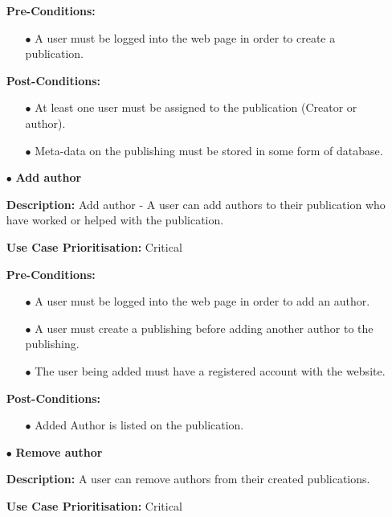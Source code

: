 \documentclass[a4paper,12pt]{article}
\begin{document}
\begin{itemize}
	\textbf{Pre-Conditions:}
	\begin{itemize}
		\item[$\bullet$]A user must be logged into the web page in order to create a publication.
		\\
	\end{itemize}
	\textbf{Post-Conditions: }
	\begin{itemize}
		\item[$\bullet$]At least one user must be assigned to the publication (Creator or author).
		\item[$\bullet$]Meta-data on the publishing must be stored in some form of database.
		\\
	\end{itemize}
	\item[$\bullet$]\textbf{Add author}\newline

	\textbf{Description:} Add author - A user can add authors to their publication who have worked or helped with the publication.\newline
	
	\textbf{Use Case Prioritisation:} Critical\newline

	\textbf{Pre-Conditions:}
	\begin{itemize}
		\item[$\bullet$]A user must be logged into the web page in order to add an author.
		\item[$\bullet$]A user must create a publishing before adding another author to the publishing.
		\item[$\bullet$]The user being added must have a registered account with the website.
		\\
	\end{itemize}
	\textbf{Post-Conditions: }
	\begin{itemize}
		\item[$\bullet$]Added Author is listed on the publication.
		\\
	\end{itemize}
	\newpage
	\item[$\bullet$]\textbf{Remove author}\newline

	\textbf{Description:} A user can remove authors from their created publications.\newline
	
	\textbf{Use Case Prioritisation:} Critical\newline


\end{itemize}
\end{document}
